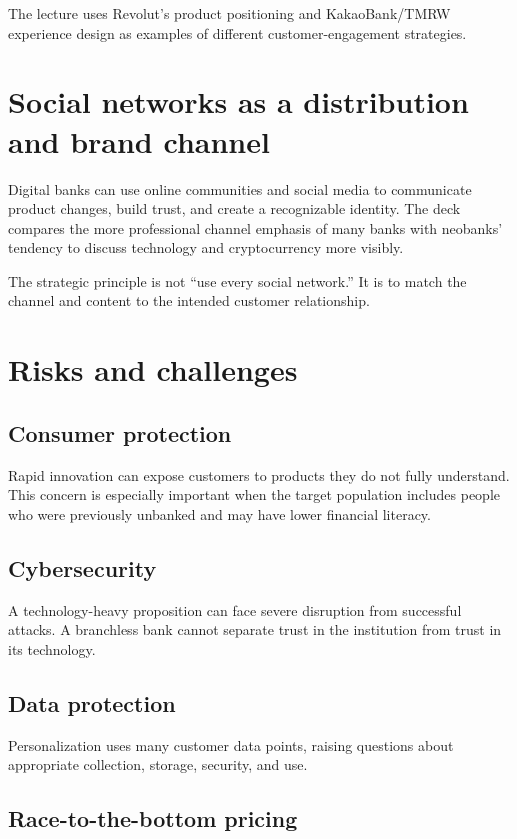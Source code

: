 The lecture uses Revolut's product positioning and KakaoBank/TMRW experience design as examples of different customer-engagement strategies.

\section{Social networks as a distribution and brand channel}

Digital banks can use online communities and social media to communicate product changes, build trust, and create a recognizable identity. The deck compares the more professional channel emphasis of many banks with neobanks' tendency to discuss technology and cryptocurrency more visibly.

The strategic principle is not ``use every social network.'' It is to match the channel and content to the intended customer relationship.

\section{Risks and challenges}

\subsection{Consumer protection}

Rapid innovation can expose customers to products they do not fully understand. This concern is especially important when the target population includes people who were previously unbanked and may have lower financial literacy.

\subsection{Cybersecurity}

A technology-heavy proposition can face severe disruption from successful attacks. A branchless bank cannot separate trust in the institution from trust in its technology.

\subsection{Data protection}

Personalization uses many customer data points, raising questions about appropriate collection, storage, security, and use.

\subsection{Race-to-the-bottom pricing}

